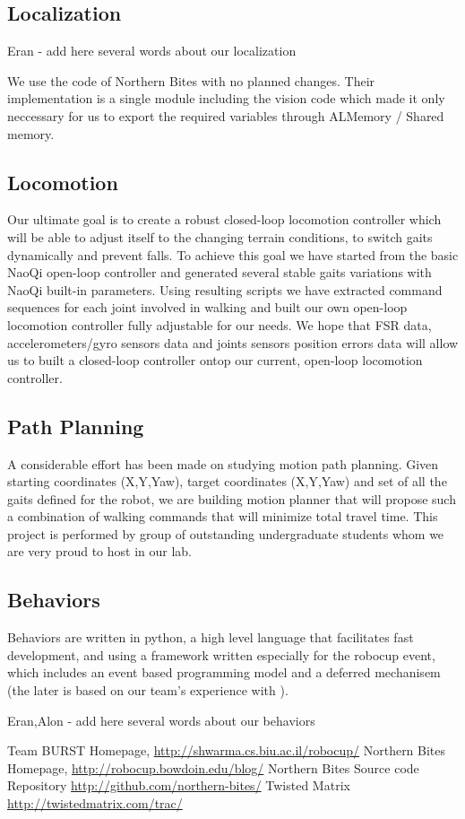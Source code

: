 \documentclass[runningheads,a4paper]{llncs}
\begin{document}
\subsection{Localization}
\label{localization}
Eran - add here several words about our localization

We use the code of Northern Bites \cite{northern,northern-repo} with no planned changes. Their implementation is a single module including the vision code which made it only neccessary for us to export the required variables through ALMemory / Shared memory.

\subsection{Locomotion}
Our ultimate goal is to create a robust closed-loop locomotion controller which will be able to adjust itself to the changing terrain conditions, to switch gaits dynamically and prevent falls. To achieve this goal we have started from the basic NaoQi open-loop controller and generated several stable gaits variations with NaoQi built-in parameters. Using resulting scripts we have extracted command sequences for each joint involved in walking and built our own open-loop locomotion controller fully adjustable for our needs. We hope that FSR data, accelerometers/gyro sensors data and joints sensors position errors data will allow us to built a closed-loop controller ontop our current, open-loop locomotion controller.

\subsection{Path Planning}
A considerable effort has been made on studying motion path planning. Given starting coordinates (X,Y,Yaw), target coordinates (X,Y,Yaw) and set of all the gaits defined for the robot, we are building motion planner that will propose such a combination of walking commands that will minimize total travel time. This project is performed by group of outstanding undergraduate students whom we are very proud to host in our lab.

\subsection{Behaviors}
\label{behavior}
Behaviors are written in python, a high level language that facilitates fast development, and using a framework written especially for the robocup event, which includes an event based programming model and a deferred mechanisem (the later is based on our team's experience with \cite{twisted}).

Eran,Alon - add here several words about our behaviors

\label{references}


\begin{thebibliography}{4}

 Team BURST Homepage, \url{http://shwarma.cs.biu.ac.il/robocup/}
 Northern Bites Homepage,
\url{http://robocup.bowdoin.edu/blog/}
 Northern Bites Source code Repository
\url{http://github.com/northern-bites/}
 Twisted Matrix
\url{http://twistedmatrix.com/trac/}
\end{thebibliography}
\end{document}
